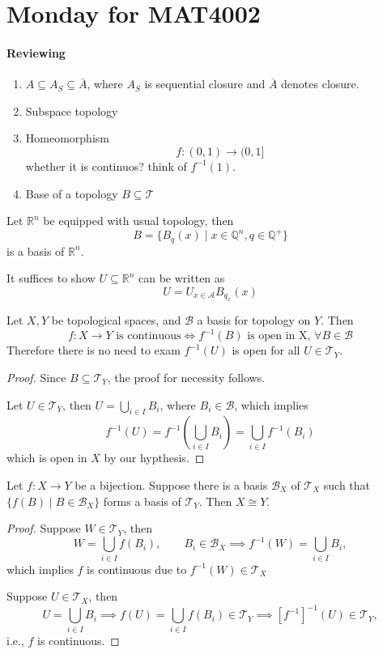 \section{Monday for MAT4002}

\paragraph{Reviewing}
\begin{enumerate}
\item
$A\subseteq A_S\subseteq\overline{A}$, where $A_S$ is sequential closure and $\overline{A}$ denotes closure.
\item
Subspace topology
\item
Homeomorphism
\[
f:(0,1)\to(0,1]
\]
whether it is continuos? think of $f^{-1}(1)$.
\item
Base of a topology $B\subseteq\mathcal{T}$
\end{enumerate}

Let $\mathbb{R}^n$ be equipped with usual topology, then
\[
B=\{B_q(x)\mid x\in\mathbb{Q}^n,q\in\mathbb{Q}^+\}
\]
is a basis of $\mathbb{R}^n$.

It suffices to show $U\subseteq\mathbb{R}^n$ can be written as 
\[
U=U_{x\in\mathcal{A}}B_{q_x}(x)
\]

\begin{proposition}
Let $X,Y$ be topological spaces, and $\mathcal{B}$ a basis for topology on $Y$. Then
\[
f:X\to Y\text{ is continuous}
\Longleftrightarrow
f^{-1}(B)\text{ is open in X, }\forall B\in\mathcal{B}
\]
Therefore there is no need to exam $f^{-1}(U)$ is open for all $U\in\mathcal{T}_Y$.
\end{proposition}

\begin{proof}
Since $B\subseteq\mathcal{T}_Y$, the proof for necessity follows.

Let $U\in\mathcal{T}_Y$, then $U=\bigcup_{i\in I}B_i$, where $B_i\in\mathcal{B}$, which implies
\[
f^{-1}(U)=f^{-1}\left(
\bigcup_{i\in I}B_i
\right)
=
\bigcup_{i\in I}f^{-1}(B_i)
\]
which is open in $X$ by our hypthesis.
\end{proof}

\begin{corollary}\label{cor:3:1}
Let $f:X\to Y$ be a bijection. Suppose there is a basis $\mathcal{B}_X$ of $\mathcal{T}_X$ such that $\{f(B)\mid B\in\mathcal{B}_X\}$ forms a basis of $\mathcal{T}_Y$. Then $X\cong Y$.
\end{corollary}
\begin{proof}
Suppose $W\in\mathcal{T}_Y$, then
\[
W=\bigcup_{i\in I}f(B_i),\qquad
B_i\in\mathcal{B}_X\implies
f^{-1}(W)=\bigcup_{i\in I}B_i,
\]
which implies $f$ is continuous due to $f^{-1}(W)\in\mathcal{T}_X$

Suppose $U\in\mathcal{T}_X$, then
\[
U=\bigcup_{i\in I}B_i\implies
f(U)=\bigcup_{i\in I}f(B_i)\in\mathcal{T}_Y\implies
[f^{-1}]^{-1}(U)\in\mathcal{T}_Y,
\]
i.e., $f$ is continuous.
\end{proof}

